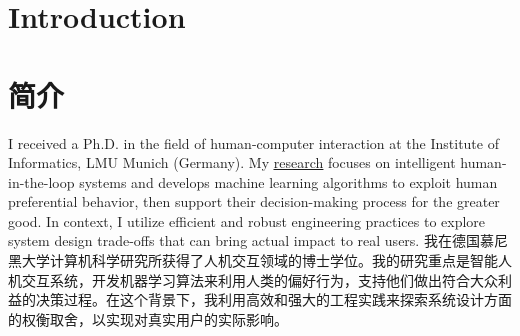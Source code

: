  {
\section{\textbf{Introduction}}
}{
\section{\textbf{简介}}
}
 {
\small
I received a Ph.D. in the field of human-computer interaction at the Institute of Informatics, LMU Munich (Germany). My \href{https://changkun.de/research}{\underline{research}} focuses on intelligent human-in-the-loop systems and develops machine learning algorithms to exploit human preferential behavior, then support their decision-making process for the greater good. In context, I utilize efficient and robust engineering practices to explore system design trade-offs that can bring actual impact to real users.
}{
\small
我在德国慕尼黑大学计算机科学研究所获得了人机交互领域的博士学位。我的研究重点是智能人机交互系统，开发机器学习算法来利用人类的偏好行为，支持他们做出符合大众利益的决策过程。在这个背景下，我利用高效和强大的工程实践来探索系统设计方面的权衡取舍，以实现对真实用户的实际影响。
}